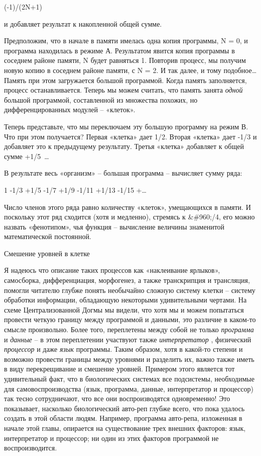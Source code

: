 \documentclass[../main.tex]{subfiles}
\begin{document}
(-1)/(2N+1)

и добавляет результат к накопленной общей сумме.

Предположим, что в начале в памяти имелась одна копия программы, N = 0, и программа находилась в режиме А. Результатом явится копия программы в соседнем районе памяти, N будет равняться 1. Повторив процесс, мы получим новую копию в соседнем районе памяти, с N = 2. И так далее, и тому подобное\ldots{} Память при этом загружается большой программой. Когда память заполняется, процесс останавливается. Теперь мы можем считать, что память занята \emph{одной} большой программой, составленной из множества похожих, но дифференцированных модулей \--- «клеток».

Теперь представьте, что мы переключаем эту большую программу на режим В. Что при этом получается? Первая «клетка» дает 1/2. Вторая «клетка» дает -1/3 и добавляет это к предыдущему результату. Третья «клетка» добавляет к общей сумме +1/5~\ldots{}

В результате весь «организм» \--- большая программа \--- вычисляет сумму ряда:

1 -1/3 +1/5 -1/7 +1/9 -1/11 +1/13 -1/15 +\ldots{}

Число членов этого ряда равно количеству «клеток», умещающихся в памяти. И поскольку этот ряд сходится (хотя и медленно), стремясь к \&\#960;/4, его можно назвать «фенотипом», чья функция \--- вычисление величины знаменитой математической постоянной.

Смешение уровней в клетке

Я надеюсь что описание таких процессов как «наклеивание ярлыков», самосборка, дифференциация, морфогенез, а также транскрипция и трансляция, помогли читателю глубже понять необычайно сложную систему клетки \--- систему обработки информации, обладающую некоторыми удивительными чертами. На схеме Централизованной Догмы мы видели, что хотя мы и можем попытаться провести четкую границу между программой и данными, это различие в каком-то смысле произвольно. Более того, переплетены между собой не только \emph{программа} и \emph{данные} \--- в этом переплетении участвуют также \emph{интерпретатор} , физический \emph{процессор} и даже \emph{язык} программы. Таким образом, хотя в какой-то степени и возможно провести границы между уровнями и разделить их, важно также иметь в виду перекрещивание и смешение уровней. Примером этого является тот удивительный факт, что в биологических системах все подсистемы, необходимые для самовоспроизводства (язык, программа, данные, интерпретатор и процессор) так тесно сотрудничают, что все они воспроизводятся одновременно! Это показывает, насколько биологический авто-реп глубже всего, что пока удалось создать в этой области людям. Например, программа авто-репа, изложенная в начале этой главы, опирается на существование трех внешних факторов: язык, интерпретатор и процессор; ни один из этих факторов программой не воспроизводится.
\end{document}
